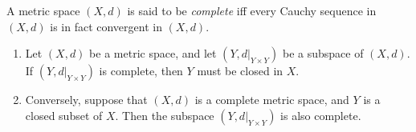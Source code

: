 \begin{defn}\label{ii:1.4.10}
  A metric space \((X, d)\) is said to be \emph{complete} iff every Cauchy sequence in \((X, d)\) is in fact convergent in \((X, d)\).
\end{defn}

\setcounter{thm}{11}
\begin{prop}\label{ii:1.4.12}
  \quad
  \begin{enumerate}
    \item\label{ii:1.4.12.a} Let \((X, d)\) be a metric space, and let \((Y, d|_{Y \times Y})\) be a subspace of \((X, d)\).
    If \((Y, d|_{Y \times Y})\) is complete, then \(Y\) must be closed in \(X\).
    \item\label{ii:1.4.12.b} Conversely, suppose that \((X, d)\) is a complete metric space, and \(Y\) is a closed subset of \(X\).
    Then the subspace \((Y, d|_{Y \times Y})\) is also complete.
  \end{enumerate}
\end{prop}

